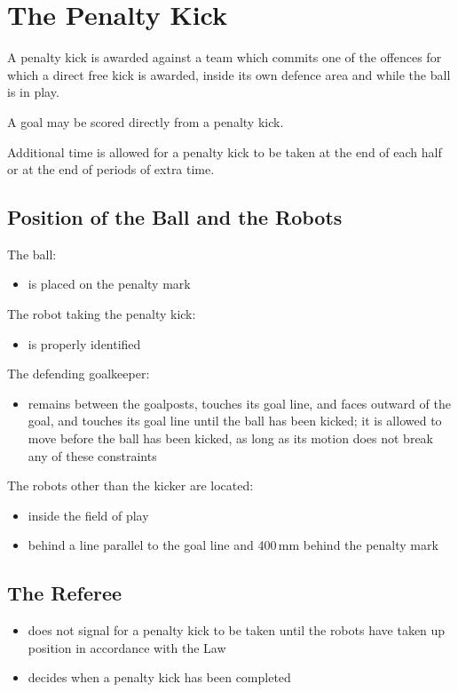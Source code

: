 \section{The Penalty Kick}\label{sec:penalty-kick}

A penalty kick is awarded against a team which commits one of the offences for which a direct free kick is awarded, inside its own defence area and while the ball is in play.

A goal may be scored directly from a penalty kick.

Additional time is allowed for a penalty kick to be taken at the end of each half or at the end of periods of extra time.

\subsection{Position of the Ball and the Robots}
The ball:
\begin{itemize}
\item is placed on the penalty mark
\end{itemize}

The robot taking the penalty kick:
\begin{itemize}
\item is properly identified
\end{itemize}

The defending goalkeeper:
\begin{itemize}
\item remains between the goalposts, touches its goal line, and faces outward of the goal, and touches its goal line until the ball has been kicked; it is allowed to move before the ball has been kicked, as long as its motion does not break any of these constraints
\end{itemize}

The robots other than the kicker are located:
\begin{itemize}
\item inside the field of play
\item behind a line parallel to the goal line and 400\,mm behind the penalty mark
\end{itemize}

\subsection{The Referee}
\begin{itemize}
\item does not signal for a penalty kick to be taken until the robots have taken up position in accordance with the Law
\item decides when a penalty kick has been completed
\end{itemize}

